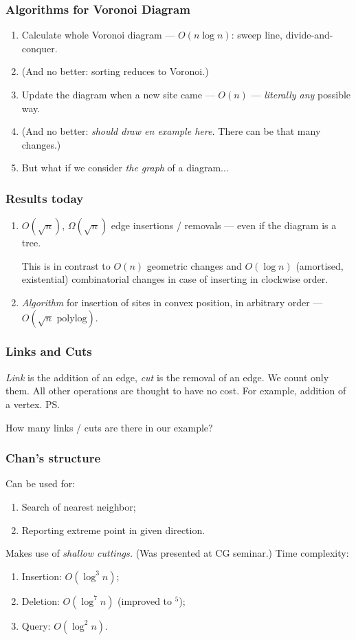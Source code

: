 \begin{frame} \frametitle{Algorithms for Voronoi Diagram}
\begin{enumerate}
	\item Calculate whole Voronoi diagram — $O(n \log n)$: sweep line, divide-and-conquer. \bigskip
	\item (And no better: sorting reduces to Voronoi.) \bigskip
	\item Update the diagram when a new site came — $O(n)$ — {\it literally any} possible way. \bigskip
	\item (And no better: {\it should draw en example here.} There can be that many changes.) \bigskip
	\item But what if we consider {\it the graph} of a diagram...
\end{enumerate}
\end{frame}

\begin{frame} \frametitle{Results today}
\begin{enumerate}
	\item $O(\sqrt{n})$, $\Omega(\sqrt{n})$ edge insertions / removals — even if the diagram is a tree. \bigskip
	
	This is in contrast to $O(n)$ geometric changes and $O(\log n)$ (amortised, existential) combinatorial changes in case of inserting in clockwise order. \bigskip

	\item {\it Algorithm} for insertion of sites in convex position, in arbitrary order — $O(\sqrt{n}\text{ polylog})$.
\end{enumerate}
\end{frame}

\begin{frame} \frametitle{Links and Cuts}
	{\it Link} is the addition of an edge, {\it cut} is the removal of an edge. We count only them. All other operations are thought to have no cost. For example, addition of a vertex. \ps

	How many links / cuts are there in our example?
\end{frame}

\begin{frame} \frametitle{Chan's structure}
Can be used for:
	\begin{enumerate}
	\item Search of nearest neighbor;
	\item Reporting extreme point in given direction.
	\end{enumerate} \bigskip
Makes use of {\it shallow cuttings.} (Was presented at CG seminar.) Time complexity:
	\begin{enumerate}
	\item Insertion: $O(\log^3 n)$;
	\item Deletion: $O(\log^7 n)$ (improved to $^5$);
	\item Query: $O(\log^2 n)$.
	\end{enumerate}
\end{frame}

